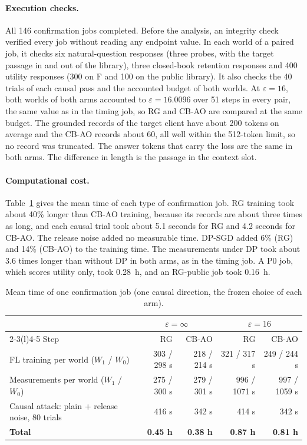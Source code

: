 \documentclass[11pt]{article}
\begin{document}
\paragraph{Execution checks.} All 146 confirmation jobs completed. Before the analysis, an integrity check verified every job without reading any endpoint value. In each world of a paired job, it checks six natural-question responses (three probes, with the target passage in and out of the library), three closed-book retention responses and 400 utility responses (300 on F and 100 on the public library). It also checks the 40 trials of each causal pass and the accounted budget of both worlds. At $\varepsilon=16$, both worlds of both arms accounted to $\varepsilon=16.0096$ over 51 steps in every pair, the same value as in the timing job, so RG and CB-AO are compared at the same budget. The grounded records of the target client have about 200 tokens on average and the CB-AO records about 60, all well within the 512-token limit, so no record was truncated. The answer tokens that carry the loss are the same in both arms. The difference in length is the passage in the context slot.

\paragraph{Computational cost.} Table~\ref{tab:conf-timing} gives the mean time of each type of confirmation job. RG training took about 40\% longer than CB-AO training, because its records are about three times as long, and each causal trial took about 5.1 seconds for RG and 4.2 seconds for CB-AO. The release noise added no measurable time. DP-SGD added 6\% (RG) and 14\% (CB-AO) to the training time. The measurements under DP took about 3.6 times longer than without DP in both arms, as in the timing job. A P0 job, which scores utility only, took 0.28~h, and an RG-public job took 0.16~h.

\begin{table}[htbp]
\centering
\caption{Mean time of one confirmation job (one causal direction, the frozen choice of each arm).}\label{tab:conf-timing}
\small
\begin{tabular}{@{}lrrrr@{}}
\toprule
 & \multicolumn{2}{c}{$\varepsilon=\infty$} & \multicolumn{2}{c}{$\varepsilon=16$} \\
\cmidrule(lr){2-3}\cmidrule(l){4-5}
Step & RG & CB-AO & RG & CB-AO \\
\midrule
FL training per world ($W_1$ / $W_0$) & 303 / 298 s & 218 / 214 s & 321 / 317 s & 249 / 244 s \\
Measurements per world ($W_1$ / $W_0$) & 275 / 300 s & 279 / 301 s & 996 / 1071 s & 997 / 1059 s \\
Causal attack: plain + release noise, 80 trials & 416 s & 342 s & 414 s & 342 s \\
\textbf{Total} & \textbf{0.45 h} & \textbf{0.38 h} & \textbf{0.87 h} & \textbf{0.81 h} \\
\bottomrule
\end{tabular}
\end{table}
\end{document}

